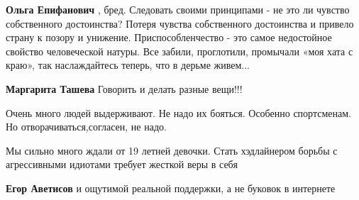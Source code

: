 \begin{itemize}
\begin{itemize}
 
\textbf{Ольга Епифанович} , бред. Следовать своими принципами - не это ли
чувство собственного достоинства? Потеря чувства собственного достоинства и
привело страну к позору и унижение. Приспособленчество - это самое недостойное
свойство человеческой натуры. Все забили, проглотили, промычали «моя хата с
краю», так наслаждайтесь теперь, что в дерьме живем...

 
\textbf{Маргарита Ташева} Говорить и делать разные вещи!!!
\end{itemize}

 
Очень много людей выдерживают.
Не надо их бояться.
Особенно спортсменам.
Но отворачиваться,согласен, не надо.

 
Мы сильно много ждали от 19 летней девочки.
Стать хэдлайнером борьбы с агрессивными идиотами требует жесткой веры в себя

\begin{itemize}
 

\textbf{Егор Аветисов} и ощутимой реальной поддержки, а не буковок в интернете


\end{itemize}
\end{itemize}
